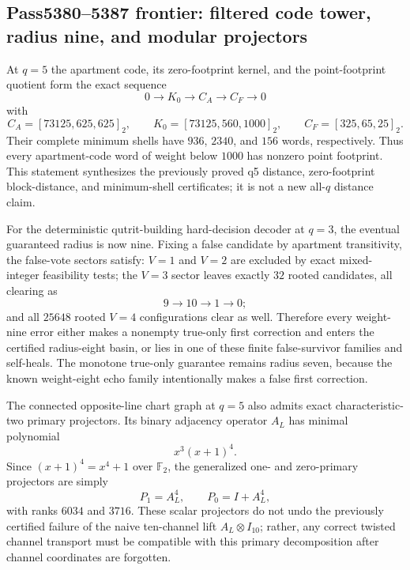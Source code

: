 
\subsection*{Pass5380--5387 frontier: filtered code tower, radius nine, and modular projectors}

At $q=5$ the apartment code, its zero-footprint kernel, and the point-footprint quotient form the exact sequence
\[
0\longrightarrow K_0\longrightarrow C_A\longrightarrow C_F\longrightarrow0
\]
with
\[
C_A=[73125,625,625]_2,\qquad
K_0=[73125,560,1000]_2,\qquad
C_F=[325,65,25]_2.
\]
Their complete minimum shells have $936$, $2340$, and $156$ words, respectively.  Thus every apartment-code word of weight below $1000$ has nonzero point footprint.  This statement synthesizes the previously proved q5 distance, zero-footprint block-distance, and minimum-shell certificates; it is not a new all-$q$ distance claim.

For the deterministic qutrit-building hard-decision decoder at $q=3$, the eventual guaranteed radius is now nine.  Fixing a false candidate by apartment transitivity, the false-vote sectors satisfy: $V=1$ and $V=2$ are excluded by exact mixed-integer feasibility tests; the $V=3$ sector leaves exactly $32$ rooted candidates, all clearing as
\[
9\to10\to1\to0;
\]
and all $25648$ rooted $V=4$ configurations clear as well.  Therefore every weight-nine error either makes a nonempty true-only first correction and enters the certified radius-eight basin, or lies in one of these finite false-survivor families and self-heals.  The monotone true-only guarantee remains radius seven, because the known weight-eight echo family intentionally makes a false first correction.

The connected opposite-line chart graph at $q=5$ also admits exact characteristic-two primary projectors.  Its binary adjacency operator $A_L$ has minimal polynomial
\[
x^3(x+1)^4.
\]
Since $(x+1)^4=x^4+1$ over $\mathbb F_2$, the generalized one- and zero-primary projectors are simply
\[
P_1=A_L^4,\qquad P_0=I+A_L^4,
\]
with ranks $6034$ and $3716$.  These scalar projectors do not undo the previously certified failure of the naive ten-channel lift $A_L\otimes I_{10}$; rather, any correct twisted channel transport must be compatible with this primary decomposition after channel coordinates are forgotten.

